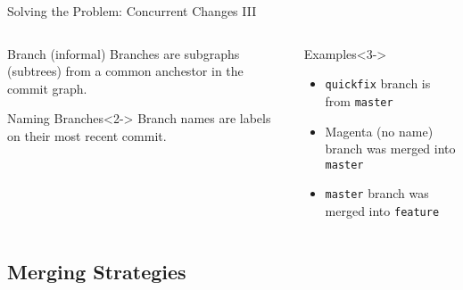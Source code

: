 \documentclass[xetex]{beamer}
\begin{document}
\begin{frame}[fragile]{Solving the Problem: Concurrent Changes III}
  \begin{columns}[t]
    \begin{column}{.5\linewidth}
      \begin{block}{Branch (informal)}
        Branches are subgraphs (subtrees) from a common anchestor in the commit
        graph.
      \end{block}
      \begin{alertblock}{Naming Branches}<2->
        Branch names are labels on their most recent commit.
      \end{alertblock}
    \end{column}
    \begin{column}{.5\linewidth}
      \begin{exampleblock}{Examples}<3->
        \begin{itemize}
          \item \texttt{quickfix} branch is from \texttt{master}
          \item Magenta (no name) branch was merged into \texttt{master}
          \item \texttt{master} branch was merged into \texttt{feature}
        \end{itemize}
      \end{exampleblock}
    \end{column}
  \end{columns}
\end{frame}

\subsection{Merging Strategies}
\end{document}
